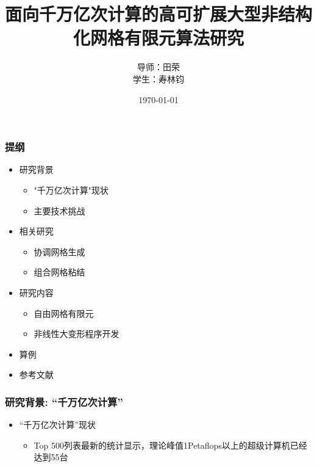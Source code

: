 \documentclass[mathserif]{beamer}
\begin{document}
\begin{CJK}{UTF8}{gkai}
	
\title{面向千万亿次计算的高可扩展大型非结构化网格有限元算法研究}
\author{导师：田荣 \\ 学生：寿林钧} 
\date{\today} 

\begin{frame}
	\titlepage
\end{frame}

    \begin{frame}
        \frametitle{提纲}
        \begin{itemize}
            \item 研究背景
                \begin{itemize}
                \item "千万亿次计算"现状
                \item 主要技术挑战
                \end{itemize}
            \item 相关研究
                \begin{itemize}
                \item 协调网格生成
                \item 组合网格粘结
                \end{itemize}
            \item 研究内容
    		  \begin{itemize}
    		  	\item 自由网格有限元
            \item 非线性大变形程序开发
    		  \end{itemize}
            \item 算例
            \item 参考文献
        \end{itemize}
	\end{frame}
	

	\begin{frame}
	  \frametitle{研究背景: “千万亿次计算”}
	  \begin{itemize}
		\item “千万亿次计算”现状
		   \begin{itemize}
			\item Top 500列表最新的统计显示，理论峰值1Petaflops以上的超级计算机已经达到55台
		   \end{itemize} 
		   

\end{itemize}
\end{frame}
\end{CJK}
\end{document}
